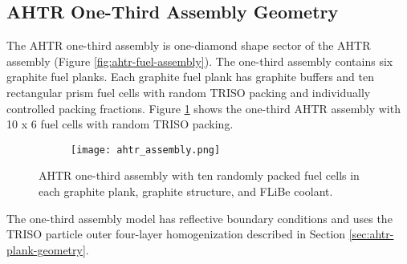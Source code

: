 \subsection{AHTR One-Third Assembly Geometry}
\label{sec:ahtr-assem-geometry}
The \gls{AHTR} one-third assembly is one-diamond shape sector of the \gls{AHTR} assembly
(Figure \ref{fig:ahtr-fuel-assembly}). 
The one-third assembly contains six graphite fuel planks.
Each graphite fuel plank has graphite buffers and ten rectangular prism fuel cells 
with random TRISO packing and individually controlled packing fractions. 
Figure \ref{fig:ahtr_assembly} shows the one-third \gls{AHTR} assembly with 10 x 6 
fuel cells with random \gls{TRISO} packing.
\begin{figure}[htbp]
    \centering
    \begin{subfigure}{.7\textwidth}
    \texttt{[image: ahtr\_assembly.png]}
    \end{subfigure}%
    \begin{subfigure}{.3\textwidth}
        \vspace{1cm}
    \end{subfigure}
    \caption{\acrfull{AHTR} one-third assembly with ten randomly packed fuel cells 
    in each graphite plank, graphite structure, and \gls{FLiBe} coolant.}
    \label{fig:ahtr_assembly}
\end{figure}
The one-third assembly model has reflective boundary conditions and  
uses the \gls{TRISO} particle outer four-layer 
homogenization described in Section \ref{sec:ahtr-plank-geometry}.

